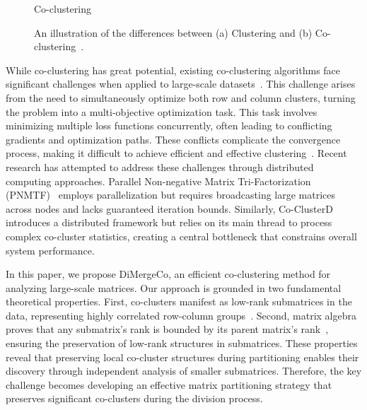 \documentclass[journal]{IEEEtran}
\renewcommand{\cite}[1]{~\autocite{#1}}
\begin{document}
\begin{figure}[!t]
\begin{minipage}[b]{0.22\textwidth}
        \caption{Co-clustering}
        \label{fig:cocluster}
    \end{minipage}%
    \caption{An illustration of the differences between (a) Clustering and (b) Co-clustering\cite{yan2017CoclusteringMultidimensionalBig}.}
    \label{fig:cocomparison}
\end{figure}


While co-clustering has great potential, existing co-clustering algorithms face significant challenges when applied to large-scale datasets\cite{cheng2015CoClusterDDistributedFramework}. This challenge arises from the need to simultaneously optimize both row and column clusters, turning the problem into a multi-objective optimization task. This task involves minimizing multiple loss functions concurrently, often leading to conflicting gradients and optimization paths. These conflicts complicate the convergence process, making it difficult to achieve efficient and effective clustering\cite{coello2007EvolutionaryAlgorithmsSolving}. Recent research has attempted to address these challenges through distributed computing approaches. Parallel Non-negative Matrix Tri-Factorization (PNMTF)\cite{chen2023ParallelNonNegativeMatrix} employs parallelization but requires broadcasting large matrices across nodes and lacks guaranteed iteration bounds. Similarly, Co-ClusterD\cite{cheng2015CoClusterDDistributedFramework} introduces a distributed framework but relies on its main thread to process complex co-cluster statistics, creating a central bottleneck that constrains overall system performance.

In this paper, we propose DiMergeCo, an efficient co-clustering method for analyzing large-scale matrices. Our approach is grounded in two fundamental theoretical properties. First, co-clusters manifest as low-rank submatrices in the data, representing highly correlated row-column groups\cite{zhao2016IdentifyingMultidimensionalCoclusters,wu2024ScalableCoClusteringLargeScale}. Second, matrix algebra proves that any submatrix's rank is bounded by its parent matrix's rank\cite{horn1985MatrixAnalysis}, ensuring the preservation of low-rank structures in submatrices. These properties reveal that preserving local co-cluster structures during partitioning enables their discovery through independent analysis of smaller submatrices. Therefore, the key challenge becomes developing an effective matrix partitioning strategy that preserves significant co-clusters during the division process.
\end{document}

